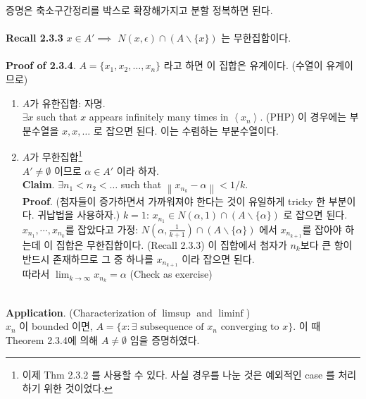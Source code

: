 \documentclass[12pt]{report}
\newcommand{\norm}[1]{\left\lVert#1\right\rVert}
\renewcommand{\span}[1]{\left\langle #1 \right\rangle}
\newcommand{\ds}{\displaystyle}
\newcommand{\imp}{\implies}
\newcommand{\bs}{\backslash}
\begin{document}
증명은 축소구간정리를 박스로 확장해가지고 분할 정복하면 된다.\\
\\
\textbf{Recall 2.3.3} $x \in A' \imp$ $N(x, \epsilon)\cap (A\bs \{x\}) $ 는 무한집합이다.\\
\\
\textbf{Proof of 2.3.4}. $ A = \{x_1, x_2, \dots, x_n\} $ 라고 하면 이 집합은 유계이다. (수열이 유계이므로)
\begin{enumerate}
	\item $A$가 유한집합: 자명.\\
	$ \exists x$ such that $x$ appears infinitely many times in $\span{x_n}$. (PHP) 이 경우에는 부분수열을 $x, x, \dots$ 로 잡으면 된다. 이는 수렴하는 부분수열이다.
	\item $ A $가 무한집합\footnote{이제 Thm 2.3.2 를 사용할 수 있다. 사실 경우를 나눈 것은 예외적인 case 를 처리하기 위한 것이었다.}\\
	$A'\neq \emptyset$ 이므로 $\alpha\in A'$ 이라 하자.\\
	\textbf{Claim}. $\exists n_1<n_2<\dots$ such that $\norm{x_{n_k}-\alpha} < 1/k$.\\
	\textbf{Proof}. (첨자들이 증가하면서 가까워져야 한다는 것이 유일하게 tricky 한 부분이다. 귀납법을 사용하자.) $k=1$: $x_{n_1} \in N(\alpha, 1)\cap (A\bs \{\alpha\})$ 로 잡으면 된다.\\
	$x_{n_1}, \cdots, x_{n_k}$를 잡았다고 가정: $N(\alpha, \frac{1}{k+1})\cap (A\bs \{\alpha\})$ 에서 $x_{n_{k+1}}$를 잡아야 하는데 이 집합은 무한집합이다. (Recall 2.3.3) 이 집합에서 첨자가 $n_k$보다 큰 항이 반드시 존재하므로 그 중 하나를 $x_{n_{k+1}}$ 이라 잡으면 된다.\\
	따라서 $\ds \lim_{k\rightarrow \infty} x_{n_k} = \alpha$ (Check as exercise)
\end{enumerate}~\\
\textbf{Application}. (Characterization of $\limsup$ and $\liminf$)\\
$x_n$ 이 bounded 이면, $A = \{x:\exists \text{ subsequence of } x_n \text{ converging to } x \}$. 이 때 Theorem 2.3.4에 의해 $A \neq \emptyset$ 임을 증명하였다.
\end{document}
